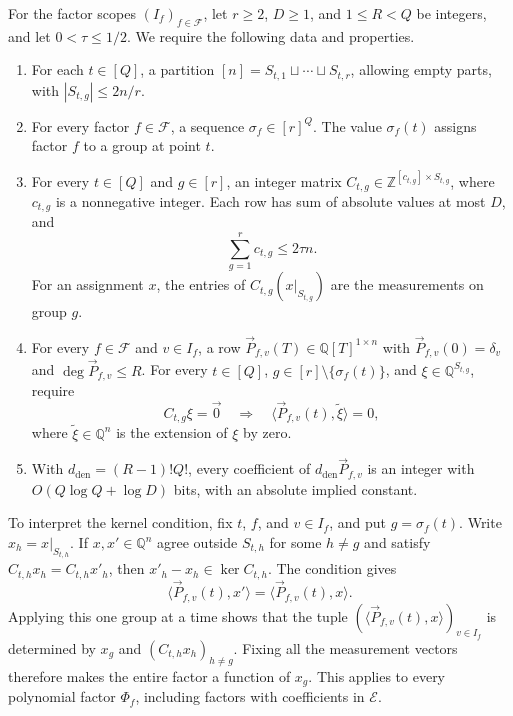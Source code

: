 \begin{definition}\label{def:layout}
For the factor scopes $(I_f)_{f\in\mathcal F}$, let $r\ge2$, $D\ge1$,
and $1\le R<Q$ be integers, and let $0<\tau\le1/2$.
We require the following data and properties.
\begin{enumerate}
\item For each $t\in[Q]$, a partition
$[n]=S_{t,1}\sqcup\cdots\sqcup S_{t,r}$, allowing empty parts,
with $|S_{t,g}|\le2n/r$.
\item For every factor $f\in\mathcal F$, a sequence
$\sigma_f\in[r]^Q$. The value $\sigma_f(t)$ assigns factor $f$
to a group at point $t$.
\item For every $t\in[Q]$ and $g\in[r]$, an integer matrix
$C_{t,g}\in\mathbb Z^{[c_{t,g}]\times S_{t,g}}$, where
$c_{t,g}$ is a nonnegative integer. Each row has sum of absolute
values at most $D$, and
\[
 \sum_{g=1}^r c_{t,g}\le2\tau n.
\]
For an assignment $x$, the entries of
$C_{t,g}(x|_{S_{t,g}})$ are the measurements on group $g$.
\item For every $f\in\mathcal F$ and $v\in I_f$, a row
$\vec{P}_{f,v}(T)\in\mathbb Q[T]^{1\times n}$ with
$\vec{P}_{f,v}(0)=\delta_v$ and $\deg \vec{P}_{f,v}\le R$.
For every $t\in[Q]$, $g\in[r]\setminus\{\sigma_f(t)\}$, and
$\xi\in\mathbb Q^{S_{t,g}}$, require
\[
 C_{t,g}\xi=\vec{0}\quad\Longrightarrow\quad
 \langle \vec{P}_{f,v}(t), \widetilde\xi\rangle=0,
\]
where $\widetilde\xi\in\mathbb Q^n$ is the extension of $\xi$ by zero.
\item With $d_{\mathrm{den}}=(R-1)!Q!$, every coefficient of
$d_{\mathrm{den}} \vec{P}_{f,v}$ is an integer with
$O(Q\log Q+\log D)$ bits, with an absolute implied constant.
\end{enumerate}
\end{definition}

To interpret the kernel condition, fix $t$, $f$, and $v\in I_f$,
and put $g=\sigma_f(t)$. Write $x_h=x|_{S_{t,h}}$.
If $x,x'\in\mathbb Q^n$ agree outside $S_{t,h}$ for some $h\ne g$
and satisfy $C_{t,h}x_h=C_{t,h}x'_h$, then
$x'_h-x_h\in\ker C_{t,h}$. The condition gives
\[
 \langle \vec{P}_{f,v}(t), x'\rangle=\langle \vec{P}_{f,v}(t), x\rangle.
\]
Applying this one group at a time shows that the tuple
$(\langle \vec{P}_{f,v}(t), x\rangle)_{v\in I_f}$ is determined by $x_g$ and
$(C_{t,h}x_h)_{h\ne g}$. Fixing all the measurement vectors therefore
makes the entire factor a function of $x_g$. This applies to every
polynomial factor $\Phi_f$, including factors with coefficients in
$\mathcal E$.

